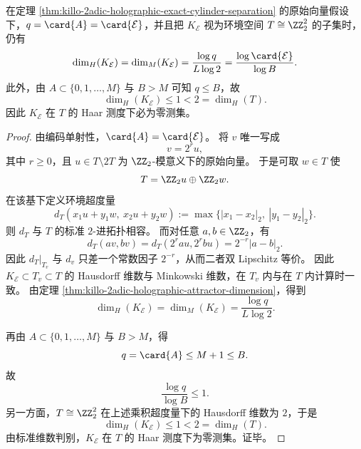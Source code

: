 \begin{corollary}\label{cor:killo-2adic-holographic-ambient-dimension-zero}
在定理 \ref{thm:killo-2adic-holographic-exact-cylinder-separation} 的原始向量假设下，\(q=\card{A}=\card{\mathcal E}\)，并且把 \(K_{\mathcal E}\) 视为环境空间 \(T\cong \ZZ_2^2\) 的子集时，仍有
\[
\dim_H(K_{\mathcal E})=\dim_M(K_{\mathcal E})=\frac{\log q}{L\log 2}=\frac{\log \card{\mathcal E}}{\log B}.
\]
此外，由 \(A\subset\{0,1,\dots,M\}\) 与 \(B>M\) 可知 \(q\le B\)，故
\[
\dim_H(K_{\mathcal E})\le 1<2=\dim_H(T).
\]
因此 \(K_{\mathcal E}\) 在 \(T\) 的 Haar 测度下必为零测集。
\end{corollary}
\begin{proof}
由编码单射性，\(\card{A}=\card{\mathcal E}\)。
将 \(v\) 唯一写成
\[
v=2^r u,
\]
其中 \(r\ge 0\)，且 \(u\in T\setminus 2T\) 为 \(\ZZ_2\)-模意义下的原始向量。
于是可取 \(w\in T\) 使
\[
T=\ZZ_2u\oplus \ZZ_2w.
\]
在该基下定义环境超度量
\[
d_T(x_1u+y_1w,\ x_2u+y_2w):=\max\{|x_1-x_2|_2,\ |y_1-y_2|_2\}.
\]
则 \(d_T\) 与 \(T\) 的标准 \(2\)-进拓扑相容。
而对任意 \(a,b\in \ZZ_2\)，有
\[
d_T(av,bv)=d_T(2^rau,2^rbu)=2^{-r}|a-b|_2.
\]
因此 \(d_T|_{T_v}\) 与 \(d_v\) 只差一个常数因子 \(2^{-r}\)，从而二者双 Lipschitz 等价。
因此 \(K_{\mathcal E}\subset T_v\subset T\) 的 Hausdorff 维数与 Minkowski 维数，在 \(T_v\) 内与在 \(T\) 内计算时一致。
由定理 \ref{thm:killo-2adic-holographic-attractor-dimension}，得到
\[
\dim_H(K_{\mathcal E})=\dim_M(K_{\mathcal E})=\frac{\log q}{L\log 2}.
\]

再由 \(A\subset\{0,1,\dots,M\}\) 与 \(B>M\)，得
\[
q=\card{A}\le M+1\le B.
\]
故
\[
\frac{\log q}{\log B}\le 1.
\]
另一方面，\(T\cong \ZZ_2^2\) 在上述乘积超度量下的 Hausdorff 维数为 \(2\)，于是
\[
\dim_H(K_{\mathcal E})\le 1<2=\dim_H(T).
\]
由标准维数判别，\(K_{\mathcal E}\) 在 \(T\) 的 Haar 测度下为零测集。证毕。
\end{proof}

